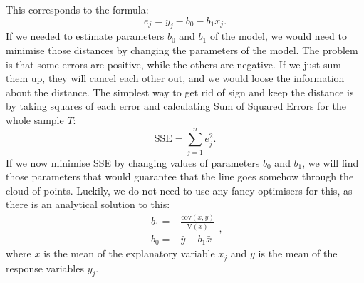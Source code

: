 \documentclass[
]{book}
\theoremstyle{definition}
\theoremstyle{definition}
\theoremstyle{definition}
\theoremstyle{definition}
\theoremstyle{remark}
\begin{document}
This corresponds to the formula:
\begin{equation}
    e_j = y_j - {b}_0 - {b}_1 x_j.
    \label{eq:SLRFormulaEstimatedError}
\end{equation}
If we needed to estimate parameters \({b}_0\) and \({b}_1\) of the model, we would need to minimise those distances by changing the parameters of the model. The problem is that some errors are positive, while the others are negative. If we just sum them up, they will cancel each other out, and we would loose the information about the distance. The simplest way to get rid of sign and keep the distance is by taking squares of each error and calculating Sum of Squared Errors for the whole sample \(T\):
\begin{equation}
    \mathrm{SSE} = \sum_{j=1}^n e_j^2 .
    \label{eq:OLSCriterion}
\end{equation}
If we now minimise SSE by changing values of parameters \({b}_0\) and \({b}_1\), we will find those parameters that would guarantee that the line goes somehow through the cloud of points. Luckily, we do not need to use any fancy optimisers for this, as there is an analytical solution to this:
\begin{equation}
    \begin{aligned}
        {b}_1 = & \frac{\mathrm{cov}(x,y)}{\mathrm{V}(x)} \\
        {b}_0 = & \bar{y} - {b}_1 \bar{x}
    \end{aligned} ,
    \label{eq:OLSSLREstimates}
\end{equation}
where \(\bar{x}\) is the mean of the explanatory variable \(x_j\) and \(\bar{y}\) is the mean of the response variables \(y_j\).
\end{document}
